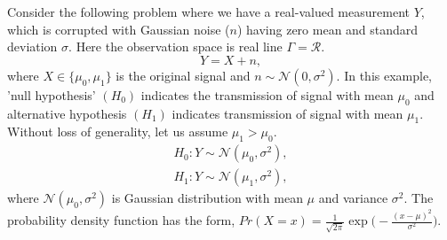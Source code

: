 \documentclass[a4paper,english,12pt]{article}
\begin{document}
\begin{exmp} 
Consider the following problem where we have a real-valued measurement $Y$, which is corrupted with Gaussian noise ($n$) having zero mean and standard deviation $\sigma$. Here the observation space is real line $\Gamma=\mathcal{R}$.
\begin{equation}
Y=X+n,
\end{equation}
where $X\in{\{\mu_{0},\mu_{1}\}}$ is the original signal and $n\sim{\mathcal{N}(0,\sigma^{2})}$. In this example, 'null hypothesis' $(H_{0})$ indicates the transmission of signal with mean $\mu_{0}$ and alternative hypothesis $(H_{1})$ indicates transmission of signal with mean $\mu_{1}$. Without loss of generality, let us assume $\mu_{1}>\mu_{0}$.
\begin{eqnarray}
{H_0} :Y \sim \mathcal{N} \left( \mu _0, \sigma^2\right), \\\nonumber
{H_1} :Y \sim \mathcal{N} \left( \mu _1, \sigma^2\right),
\end{eqnarray}
where $\mathcal{N}( \mu _0, \sigma^2)$ is Gaussian distribution with mean $\mu$ and variance $\sigma^{2}$. The probability density function has the form, $Pr(X=x)=\frac{1}{\sqrt{2\pi}}\exp{\bigl(-\frac{(x-\mu)^{2}}{\sigma^{2}}\bigl)}$.

\end{exmp}
\end{document}
